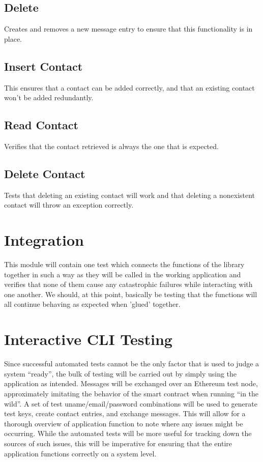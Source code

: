 \documentclass[titlepage]{report}
\begin{document}
\subsection{Delete}
Creates and removes a new message entry to ensure that this functionality is in place.
\subsection{Insert Contact}
This ensures that a contact can be added correctly, and that an existing contact won't be added redundantly.
\subsection{Read Contact}
Verifies that the contact retrieved is always the one that is expected.
\subsection{Delete Contact}
Tests that deleting an existing contact will work and that deleting a nonexistent contact will throw an exception correctly.

\section{Integration}
This module will contain one test which connects the functions of the library together in such a way as they will be called in the working application and verifies that none of them cause any catastrophic failures while interacting with one another. We should, at this point, basically be testing that the functions will all continue behaving as expected when 'glued' together.

\section{Interactive CLI Testing}
Since successful automated tests cannot be the only factor that is used to judge a system ``ready'', the bulk of testing will be carried out by simply using the application as intended. Messages will be exchanged over an \gls{Ethereum} test node, approximately imitating the behavior of the \gls{smart contract} when running ``in the wild''. A set of test uname/email/password combinations will be used to generate test keys, create contact entries, and exchange messages. This will allow for a thorough overview of application function to note where any issues might be occurring. While the automated tests will be more useful for tracking down the sources of such issues, this will be imperative for ensuring that the entire application functions correctly on a system level.
\end{document}
